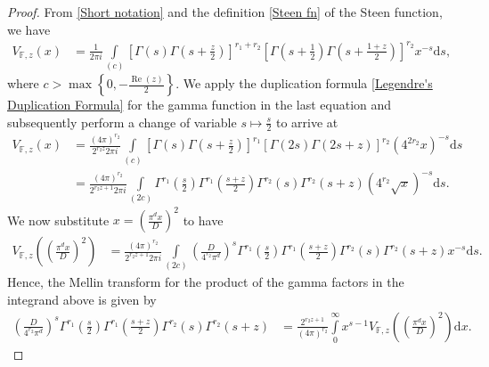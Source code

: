 \documentclass[10pt,a4paper]{amsart}
\renewcommand{\Re}{\operatorname{Re}}
\begin{document}
\begin{proof}
From \eqref{Short notation} and the definition \eqref{Steen fn} of the Steen function, we have
\begin{align*}
V_{\mathbb{F},z}\left(x\right)
&= \frac{1}{2\pi i}\int\limits_{(c)}\left[\Gamma(s)\Gamma\left(s+\frac{z}{2}\right)\right]^{r_1+r_2}\!\left[\Gamma\left(s+\frac{1}{2}\right)\Gamma\left(s+\frac{1+z}{2}\right)\right]^{r_2}\!x^{-s} \textrm{d}s,
\end{align*}
where $c > \max\left\{0, -\frac{\Re(z)}{2}\right\}$.
We apply the duplication formula \eqref{Legendre's Duplication Formula} for the gamma function in the last equation and subsequently perform a change of variable $s \mapsto \frac{s}{2}$ to arrive at
\begin{align*}
V_{\mathbb{F},z}\left(x\right)
&= \frac{(4\pi)^{r_2}}{2^{r_2 z} 2\pi i}{\displaystyle\int\limits_{(c)}\!\left[\Gamma(s)\Gamma\left(s+\frac{z}{2}\right)\right]^{r_1}\!\left[\Gamma(2s)\Gamma(2s+z)\right]^{r_2}(4^{2r_2}x)^{-s}\textrm{d}s}\\
&= \frac{(4\pi)^{r_2}}{2^{r_2 z + 1} 2\pi i}{\displaystyle\int\limits_{(2c)}\!\Gamma^{r_1}\left(\frac{s}{2}\right)\Gamma^{r_1}\left(\frac{s+z}{2}\right)\Gamma^{r_2}(s)\Gamma^{r_2}(s+z)(4^{r_2}\sqrt{x})^{-s}\textrm{d}s}.
\end{align*}
We now substitute $x = \left(\frac{\pi^{d} x}{D}\right)^2$ to have
\begin{align}\label{Inverse Mellin}
V_{\mathbb{F},z}\left(\left(\frac{\pi^{d} x}{D}\right)^2\right)
&= \frac{(4\pi)^{r_2}}{2^{r_2 z + 1}2\pi i}{\displaystyle\int\limits_{(2c)}\!\left(\frac{D}{4^{r_2}\pi^{d}}\right)^{s}\Gamma^{r_1}\left(\frac{s}{2}\right)\Gamma^{r_1}\left(\frac{s+z}{2}\right)\Gamma^{r_2}(s)\Gamma^{r_2}(s+z)x^{-s}\textrm{d}s}.
\end{align}
Hence, the Mellin transform for the product of the gamma factors in the integrand above is given by
\begin{align*}
\left(\frac{D}{4^{r_2}\pi^{d}}\right)^{s}\Gamma^{r_1}\left(\frac{s}{2}\right)\Gamma^{r_1}\left(\frac{s+z}{2}\right)\Gamma^{r_2}(s)\Gamma^{r_2}(s+z)
&= \frac{2^{r_2 z + 1}}{(4\pi)^{r_2}}\int\limits_{0}^\infty x^{s-1}V_{\mathbb{F},z}\left(\left(\frac{\pi^{d} x}{D}\right)^2\right) \mathrm{d}x.
\end{align*}
\end{proof}
\end{document}
